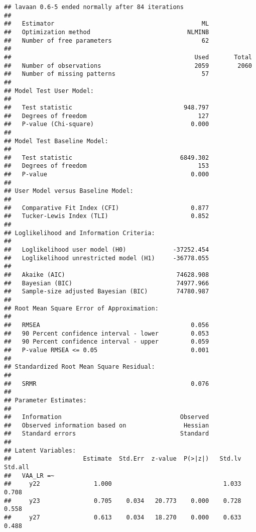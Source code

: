 \documentclass[
]{article}
\begin{document}
\begin{verbatim}
## lavaan 0.6-5 ended normally after 84 iterations
## 
##   Estimator                                         ML
##   Optimization method                           NLMINB
##   Number of free parameters                         62
##                                                       
##                                                   Used       Total
##   Number of observations                          2059        2060
##   Number of missing patterns                        57            
##                                                                   
## Model Test User Model:
##                                                       
##   Test statistic                               948.797
##   Degrees of freedom                               127
##   P-value (Chi-square)                           0.000
## 
## Model Test Baseline Model:
## 
##   Test statistic                              6849.302
##   Degrees of freedom                               153
##   P-value                                        0.000
## 
## User Model versus Baseline Model:
## 
##   Comparative Fit Index (CFI)                    0.877
##   Tucker-Lewis Index (TLI)                       0.852
## 
## Loglikelihood and Information Criteria:
## 
##   Loglikelihood user model (H0)             -37252.454
##   Loglikelihood unrestricted model (H1)     -36778.055
##                                                       
##   Akaike (AIC)                               74628.908
##   Bayesian (BIC)                             74977.966
##   Sample-size adjusted Bayesian (BIC)        74780.987
## 
## Root Mean Square Error of Approximation:
## 
##   RMSEA                                          0.056
##   90 Percent confidence interval - lower         0.053
##   90 Percent confidence interval - upper         0.059
##   P-value RMSEA <= 0.05                          0.001
## 
## Standardized Root Mean Square Residual:
## 
##   SRMR                                           0.076
## 
## Parameter Estimates:
## 
##   Information                                 Observed
##   Observed information based on                Hessian
##   Standard errors                             Standard
## 
## Latent Variables:
##                    Estimate  Std.Err  z-value  P(>|z|)   Std.lv  Std.all
##   VAA_LR =~                                                             
##     y22               1.000                               1.033    0.708
##     y23               0.705    0.034   20.773    0.000    0.728    0.558
##     y27               0.613    0.034   18.270    0.000    0.633    0.488

\end{verbatim}
\end{document}
